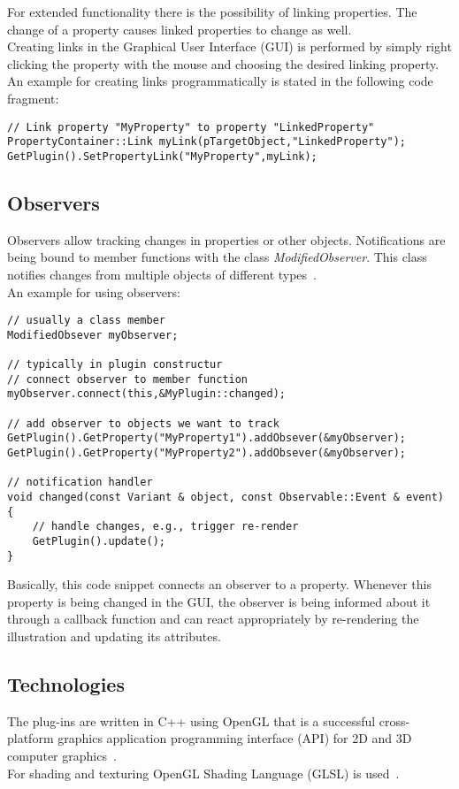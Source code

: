 For extended functionality there is the possibility of linking properties. The change of a property causes linked properties to change as well.\\
Creating links in the Graphical User Interface (GUI) is performed by simply right clicking the property with the mouse and choosing the desired linking property.\\
An example for creating links programmatically is stated in the following code fragment:
\begin{lstlisting}
// Link property "MyProperty" to property "LinkedProperty"
PropertyContainer::Link myLink(pTargetObject,"LinkedProperty");
GetPlugin().SetPropertyLink("MyProperty",myLink);
\end{lstlisting}

\subsection{Observers}
\label{chap:observers}
Observers allow tracking changes in properties or other objects. Notifications are being bound to member functions with the class \emph{ModifiedObserver}. This class notifies changes from multiple objects of different types~\cite{misc:volumeshop101}.\\
An example for using observers:
\begin{lstlisting}
// usually a class member
ModifiedObsever myObserver;

// typically in plugin constructur
// connect observer to member function
myObserver.connect(this,&MyPlugin::changed);

// add observer to objects we want to track
GetPlugin().GetProperty("MyProperty1").addObsever(&myObserver);
GetPlugin().GetProperty("MyProperty2").addObsever(&myObserver);

// notification handler
void changed(const Variant & object, const Observable::Event & event)
{
	// handle changes, e.g., trigger re-render
	GetPlugin().update();
}
\end{lstlisting}
Basically, this code snippet connects an observer to a property. Whenever this property is being changed in the GUI, the observer is being informed about it through a callback function and can react appropriately by re-rendering the illustration and updating its attributes.\\

\subsection{Technologies}
The plug-ins are written in C++ using OpenGL that is a successful cross-platform graphics application programming interface (API) for 2D and 3D computer graphics~\cite{book:computerGraphicsHill}.\\ %
For shading and texturing OpenGL Shading Language (GLSL) is used~\cite{misc:volumeshop101}.

